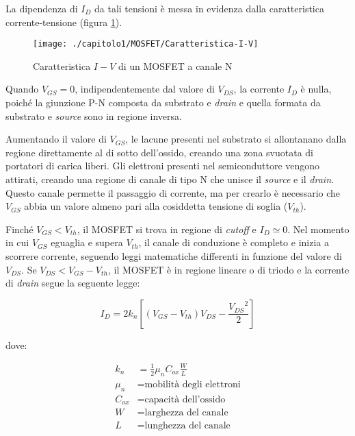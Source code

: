 La dipendenza di $I_D$ da tali tensioni è messa in evidenza dalla caratteristica corrente-tensione (figura \ref{fig:caratteristica-I-V}).

\begin{figure}[h]
  \centering
  \texttt{[image: ./capitolo1/MOSFET/Caratteristica-I-V]}
  \caption[Caratteristica $I-V$ di un MOSFET a canale N]{Caratteristica $I-V$ di un MOSFET a canale N}
  \label{fig:caratteristica-I-V}
\end{figure}

Quando $V_{GS} = 0$, indipendentemente dal valore di $V_{DS}$, la corrente $I_D$ è nulla, poiché la giunzione P-N composta da substrato e \emph{drain} e quella formata da substrato e \emph{source} sono in regione inversa.

Aumentando il valore di $V_{GS}$, le lacune presenti nel substrato si allontanano dalla regione direttamente al di sotto dell'ossido, creando una
zona svuotata di portatori di carica liberi. Gli elettroni presenti nel semiconduttore
vengono attirati, creando una regione di canale di tipo N che unisce il
\emph{source} e il \emph{drain}. Questo canale permette il passaggio di corrente, ma per crearlo è necessario che $V_{GS}$ abbia un valore almeno pari alla cosiddetta tensione di soglia ($V_{th}$). 

Finché $V_{GS} < V_{th}$, il MOSFET si trova in regione di \emph{cutoff} e $I_D \simeq 0$.
Nel momento in cui $V_{GS}$ eguaglia e supera $V_{th}$, il canale di conduzione è completo e inizia a scorrere corrente, seguendo leggi matematiche differenti in funzione del valore di $V_{DS}$.
Se $V_{DS} < V_{GS} -  V_{th}$, il MOSFET è in regione lineare o di triodo e la corrente di \emph{drain} segue la seguente legge:

\begin{equation}
  I_D = 2k_n\left[ \left(V_{GS}-V_{th}\right)V_{DS} - \frac{{V_{DS}}^2}{2}\right]
\end{equation}

dove:

\begin{align*}
   k_n &= \frac{1}{2}\mu_n C_{ox}\frac{W}{L} \\
   \mu_n &= \text{mobilità degli elettroni} \\
   C_{ox} &= \text{capacità dell'ossido} \\
   W &= \text{larghezza del canale} \\
   L &= \text{lunghezza del canale}
\end{align*}

